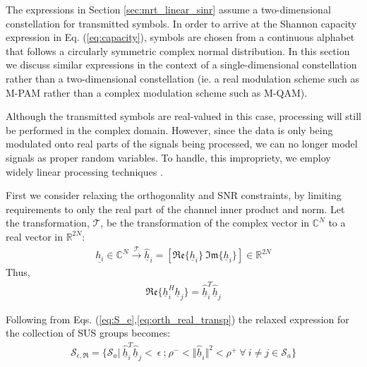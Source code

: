 The expressions in Section \ref{sec:mrt_linear_sinr} assume a two-dimensional constellation for transmitted symbols. In order to arrive at the Shannon capacity expression in Eq. (\ref{eq:capacity}), symbols are chosen from a continuous alphabet that follows a circularly symmetric complex normal distribution. In this section we discuss similar expressions in the context of a single-dimensional constellation rather than a two-dimensional constellation (ie. a real modulation scheme such as M-PAM rather than a complex modulation scheme such as M-QAM).

Although the transmitted symbols are real-valued in this case, processing will still be performed in the complex domain. However, since the data is only being modulated onto real parts of the signals being processed, we can no longer model signals as proper random variables. To handle, this impropriety, we employ widely linear processing techniques \cite{Adali2011}.

First we consider relaxing the orthogonality and SNR constraints, by limiting  requirements to only the real part of the channel inner product and norm.  Let the  transformation, $\mathcal{T}$, be the transformation of the complex vector in $\mathbb{C}^N$ to a real vector in $\mathbb{R}^{2N}$:
\begin{equation}\label{eq:complex_real_xform}
    \begin{aligned}
        \underline{h_i} \in \mathbb{C}^N \xrightarrow{\mathcal{T}} \hat{\underline{h}}_i = [ \mathfrak{Re} \lbrace \underline{h}_i \rbrace \ \mathfrak{Im}\lbrace \underline{h}_i \rbrace ] \in \mathbb{R}^{2N}
    \end{aligned}
\end{equation}
Thus,
\begin{equation}\label{eq:orth_real_transp}
    \begin{aligned}
        \mathfrak{Re} \lbrace \underline{h}_i^H\underline{h}_j \rbrace = \hat{\underline{h}}_i^T \hat{\underline{h}}_j 
    \end{aligned}
\end{equation}

Following from Eqs. (\ref{eq:S_e},\ref{eq:orth_real_transp}) the relaxed expression for the collection of SUS groups becomes:
\begin{equation}\label{eq:wl_S_e}
    \begin{aligned}
        \mathcal{S}_{\epsilon,\mathfrak{R}} = \lbrace \mathcal{S}_a \big|\  \hat{\underline{h}}_i^T \hat{\underline{h}}_j<\ \epsilon \ \text{;} \ \rho^-<\Vert \hat{\underline{h}}_i \Vert^2 < \rho^+\ \forall \ i \neq j \in \mathcal{S}_a \rbrace
    \end{aligned}
\end{equation}

